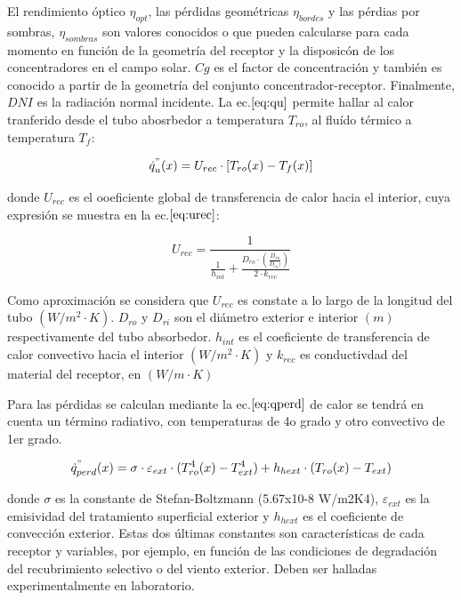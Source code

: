 El rendimiento óptico \(\eta_{opt}\), las pérdidas geométricas
\(\eta_{bordes}\) y las pérdias por sombras, \(\eta_{sombras}\) son
valores conocidos o que pueden calcularse para cada momento en función
de la geometría del receptor y la disposicón de los concentradores en el
campo solar. \(Cg\) es el factor de concentración y también es conocido
a partir de la geometría del conjunto concentrador-receptor. Finalmente,
\(DNI\) es la radiación normal incidente. La ec.\(\eqref{eq:qu}\)
permite hallar al calor tranferido desde el tubo abosrbedor a
temperatura \(T_{ro}\), al fluído térmico a temperatura \(T_{f}\):

\begin{equation}
    \dot{q}^{"}_{u}(x)= U_{rec} \cdot [T_{ro}(x)-T_{f}(x)] \label{eq:qu}
\end{equation}

donde \(U_{rec}\) es el ooeficiente global de transferencia de calor
hacia el interior, cuya expresión se muestra en la
ec.\(\eqref{eq:urec}\):

\begin{equation}
    U_{rec} = \frac{1}{\frac{1}{h_{int}} + \frac{D_{ro}\cdot(\frac{D_{ro}}{D_{ri})})}{2\cdot k_{rec}}} \label{eq:urec}
\end{equation}

Como aproximación se considera que \(U_{rec}\) es constate a lo largo de
la longitud del tubo \((W/m^{2}\cdot K)\). \(D_{ro}\) y \(D_{ri}\) son
el diámetro exterior e interior \((m)\) respectivamente del tubo
absorbedor. \(h_{int}\) es el coeficiente de transferencia de calor
convectivo hacia el interior \((W/m^{2}\cdot K)\) y \(k_{rec}\) es
conductivdad del material del receptor, en \((W/m\cdot K)\)

Para las pérdidas se calculan mediante la ec.\(\eqref{eq:qperd}\) de
calor se tendrá en cuenta un término radiativo, con temperaturas de 4o
grado y otro convectivo de 1er grado.

\begin{equation}
    \dot{q}^{"}_{perd}(x)= \sigma \cdot \varepsilon_{ext} \cdot (T_{ro}^{4}(x)-T_{ext}^{4}) + h_{hext} \cdot (T_{ro}(x)-T_{ext}) \label{eq:qperd}
\end{equation}

donde \(\sigma\) es la constante de Stefan-Boltzmann (5.67x10-8 W/m2K4),
\(\varepsilon_{ext}\) es la emisividad del tratamiento superficial
exterior y \(h_{hext}\) es el coeficiente de convección exterior. Estas
dos últimas constantes son características de cada receptor y variables,
por ejemplo, en función de las condiciones de degradación del
recubrimiento selectivo o del viento exterior. Deben ser halladas
experimentalmente en laboratorio.


